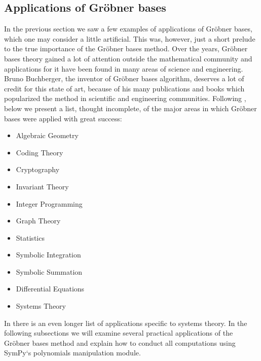 \subsection{Applications of Gröbner bases}

In the previous section we saw a few examples of applications of Gröbner bases, which one may
consider a little artificial. This was, however, just a short prelude to the true importance of
the Gröbner bases method. Over the years, Gröbner bases theory gained a lot of attention
outside the mathematical community and applications for it have been found in many areas of science
and engineering. Bruno Buchberger, the inventor of Gröbner bases algorithm, deserves a lot of
credit for this state of art, because of his many publications and books which popularized the method
in scientific and engineering communities. Following \cite{Buchberger1998applications}, below we present
a list, thought incomplete, of the major areas in which Gröbner bases were applied with great success:
\begin{itemize}
\item {}
Algebraic Geometry

\item {}
Coding Theory

\item {}
Cryptography

\item {}
Invariant Theory

\item {}
Integer Programming

\item {}
Graph Theory

\item {}
Statistics

\item {}
Symbolic Integration

\item {}
Symbolic Summation

\item {}
Differential Equations

\item {}
Systems Theory

\end{itemize}

In \cite{Buchberger2001systems} there is an even longer list of applications specific to systems theory.
In the following subsections we will examine several practical applications of the Gröbner bases
method and explain how to conduct all computations using SymPy`s polynomials manipulation module.


